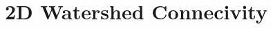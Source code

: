 \documentclass[bigger]{beamer}
\begin{document}

\section{2D Watershed Connecivity}
\begin{frame}
  \begin{center}
    \watershedconnectivity[0.8]
  \end{center}
\end{frame}

\end{document}
